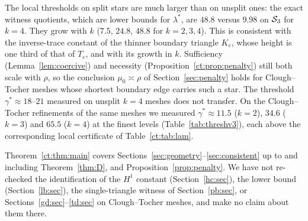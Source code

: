 \begin{remark}
The local thresholds on split stars are much larger than on unsplit ones: the exact witness quotients, which are lower bounds for $\lambda^\ast$, are $48.8$ versus $9.98$ on $\mathcal S_3$ for $k=4$. They grow with $k$ ($7.5$, $24.8$, $48.8$ for $k=2,3,4$). This is consistent with the inverse-trace constant of the thinner boundary triangle $K_e$, whose height is one third of that of $T_e$, and with its growth in $k$. Sufficiency (Lemma~\ref{lem:coercive}) and necessity (Proposition~\ref{ct:prop:penalty}) still both scale with $\rho$, so the conclusion $\mu_0\asymp\rho$ of Section~\ref{sec:penalty} holds for Clough--Tocher meshes whose shortest boundary edge carries such a star. The threshold $\gamma^\ast\approx18$--$21$ measured on unsplit $k=4$ meshes does not transfer. On the Clough--Tocher refinements of the same meshes we measured $\gamma^\ast\approx11.5$ ($k=2$), $34.6$ ($k=3$) and $65.5$ ($k=4$) at the finest levels (Table~\ref{tab:threshv3}), each above the corresponding local certificate of Table~\ref{ct:tab:lam}.
\end{remark}

\begin{remark}[Scope]\label{ct:rem:scope}
Theorem~\ref{ct:thm:main} covers Sections~\ref{sec:geometry}--\ref{sec:consistent} up to and including Theorem~\ref{thm:D}, and Proposition~\ref{prop:penalty}. We have not re-checked the identification of the $H^1$ constant (Section~\ref{hc:sec}), the lower bound (Section~\ref{lb:sec}), the single-triangle witness of Section~\ref{pb:sec}, or Sections~\ref{gd:sec}--\ref{td:sec} on Clough--Tocher meshes, and make no claim about them there.
\end{remark}
